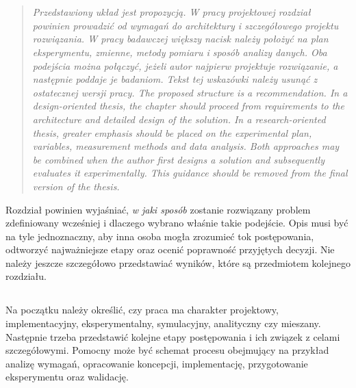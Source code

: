\chapter{}


\begin{quote}
\itshape
\ploren
  {Przedstawiony układ jest propozycją. W pracy projektowej rozdział powinien prowadzić od wymagań do architektury i szczegółowego projektu rozwiązania. W pracy badawczej większy nacisk należy położyć na plan eksperymentu, zmienne, metody pomiaru i sposób analizy danych. Oba podejścia można połączyć, jeżeli autor najpierw projektuje rozwiązanie, a następnie poddaje je badaniom. Tekst tej wskazówki należy usunąć z ostatecznej wersji pracy.}
  {The proposed structure is a recommendation. In a design-oriented thesis, the chapter should proceed from requirements to the architecture and detailed design of the solution. In a research-oriented thesis, greater emphasis should be placed on the experimental plan, variables, measurement methods and data analysis. Both approaches may be combined when the author first designs a solution and subsequently evaluates it experimentally. This guidance should be removed from the final version of the thesis.}
\end{quote}

Rozdział powinien wyjaśniać, \emph{w jaki sposób} zostanie rozwiązany problem zdefiniowany wcześniej i dlaczego wybrano właśnie takie podejście. Opis musi być na tyle jednoznaczny, aby inna osoba mogła zrozumieć tok postępowania, odtworzyć najważniejsze etapy oraz ocenić poprawność przyjętych decyzji. Nie należy jeszcze szczegółowo przedstawiać wyników, które są przedmiotem kolejnego rozdziału.

\section{}

Na początku należy określić, czy praca ma charakter projektowy, implementacyjny, eksperymentalny, symulacyjny, analityczny czy mieszany. Następnie trzeba przedstawić kolejne etapy postępowania i ich związek z celami szczegółowymi. Pomocny może być schemat procesu obejmujący na przykład analizę wymagań, opracowanie koncepcji, implementację, przygotowanie eksperymentu oraz walidację.

